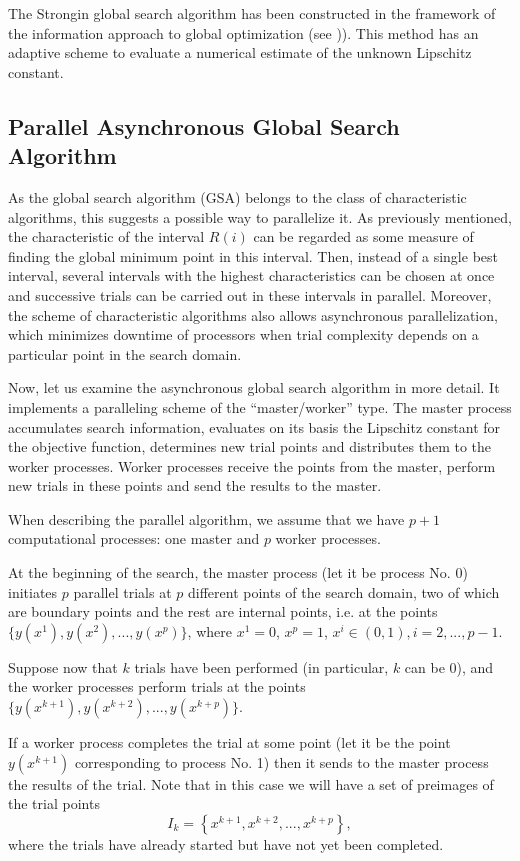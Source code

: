 \documentclass{svproc}
\begin{document}
The Strongin global search algorithm has been constructed in the framework of the information approach to global optimization (see \cite{Strongin2000})). This method has an adaptive scheme to evaluate a numerical estimate of the unknown Lipschitz constant.


\subsection{Parallel Asynchronous Global Search Algorithm}\label{Sec_PGSA}

As the global search algorithm (GSA) belongs to the class of characteristic algorithms, this suggests a possible way to parallelize it. 
As previously mentioned, the characteristic of the interval $R(i)$ can be regarded as some measure of finding the global minimum point in this interval. Then, instead of a single best interval, several intervals with the highest characteristics can be chosen at once and successive trials can be carried out in these intervals in parallel. Moreover, the scheme of characteristic algorithms also allows asynchronous parallelization, which minimizes downtime of processors when trial complexity depends on a particular point in the search domain. 

Now, let us examine the asynchronous global search algorithm in more detail. It implements a paralleling scheme of the ``master/worker'' type. The master process accumulates search information, evaluates on its basis the Lipschitz constant for the objective function, determines new trial points and distributes them to the worker processes. Worker processes receive the points from the master, perform new trials in these points and send the results to the master.

When describing the parallel algorithm, we assume that we have $p+1$ computational processes: one master and $p$ worker processes.
 
At the beginning of the search, the master process (let it be process No. 0) initiates $p$ parallel  trials at $p$ different points of the search domain, two of which are boundary points and the rest are internal points, i.e. at the points $\{y(x^1), y(x^2), ...,y(x^p)\}$, where $x^1 = 0$, $x^p = 1$, $x^i\in(0,1), i=2,..., p-1$.

Suppose now that $k$ trials have been performed (in particular, $k$ can be 0), and the worker processes perform trials at the points $\{y(x^{k+1}), y(x^{k+2}), ...,y(x^{k+p})\}$. 

If a worker process completes the trial at some point (let it be the point $y(x^{k+1})$ corresponding to process No. 1) then it sends to the master process the results of the trial. Note that in this case we will have a set of preimages of the trial points
\[
I_k = \left\{ x^{k+1},x^{k+2},...,x^{k+p} \right\},
\]
where the trials have already started but have not yet been completed.
\end{document}
